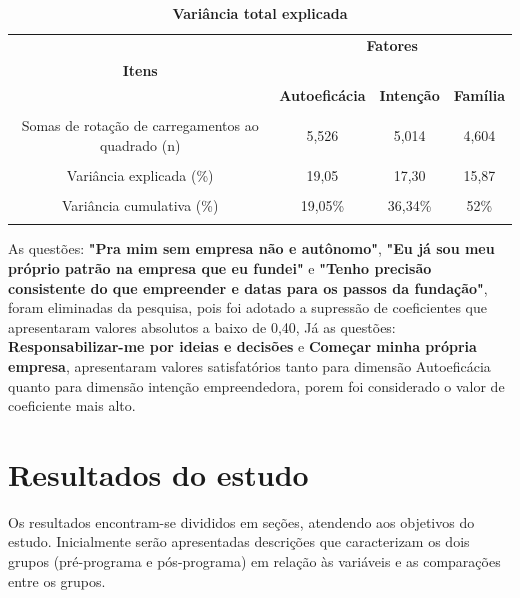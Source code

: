 \begin{table}[!htb]
\caption{\textbf{Variância total explicada}}
 
\label{tabela_4} \\ \hline\hline
\begin{tabular}{c c c c }

\multicolumn{1}{p{6cm}}{} & \multicolumn{3}{c}{\textbf{Fatores}}\\ 
 \multicolumn{1}{c}{\textbf{Itens}} & \multicolumn{3}{c}{\hrulefill}\\ 

 \multicolumn{1}{c}{} 
 &\multicolumn{1}{c}{\textbf{Autoeficácia}} & \multicolumn{1}{c}{\textbf{Intenção}} &\multicolumn{1}{c}{\textbf{Família}}  
\\\\ \hline 

 Somas de rotação de carregamentos ao quadrado (n)
 & 5,526 & 5,014 & 4,604 \\\\
 Variância explicada (\%)
 & 19,05 & 17,30 &15,87\\\\
 Variância cumulativa (\%)
 & 19,05\% & 36,34\% &52\% \\\\\hline \hline
 
\end{tabular}
\end{table}



As questões: \textbf{"Pra mim sem empresa não e autônomo"}, \textbf{"Eu já sou meu próprio patrão na empresa que eu fundei"} e \textbf{"Tenho precisão consistente do que empreender e datas para os passos da fundação"}, foram eliminadas da pesquisa, pois foi adotado a supressão de coeficientes que apresentaram valores absolutos a baixo de 0,40, Já as questões: \textbf{Responsabilizar-me por ideias e decisões} e \textbf{Começar minha própria empresa}, apresentaram valores satisfatórios tanto para dimensão Autoeficácia quanto para dimensão intenção empreendedora, porem foi considerado o valor de coeficiente mais alto.


\section{Resultados do estudo}

Os resultados encontram-se divididos em seções, atendendo aos objetivos do estudo. Inicialmente  serão  apresentadas  descrições  que  caracterizam  os  dois  grupos  (pré-programa  e pós-programa) em relação às variáveis e as comparações entre os grupos.










